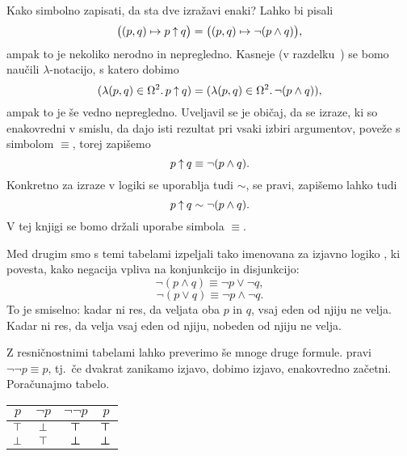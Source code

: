                 Kako simbolno zapisati, da sta dve izražavi enaki? Lahko bi pisali
                \[\big((p, q) \mapsto p \mathbin{\uparrow} q\big) = \big((p, q) \mapsto \lnot(p \land q)\big),\]
                ampak to je nekoliko nerodno in nepregledno. Kasneje (v razdelku~) se bomo naučili $\lambda$-notacijo, s katero dobimo
                \[(\lambda (p, q) \in \Omega^2 .\, p \mathbin{\uparrow} q) = (\lambda (p, q) \in \Omega^2 .\, \lnot(p \land q)),\]
                ampak to je še vedno nepregledno. Uveljavil se je običaj, da se izraze, ki so enakovredni v smislu, da dajo isti rezultat pri vsaki izbiri argumentov, poveže s simbolom $\equiv$, torej zapišemo
                \[p \mathbin{\uparrow} q \equiv \lnot(p \land q).\]
                Konkretno za izraze v logiki se uporablja tudi $\sim$, se pravi, zapišemo lahko tudi
                \[p \mathbin{\uparrow} q \sim \lnot(p \land q).\]
                V tej knjigi se bomo držali uporabe simbola $\equiv$. 

                Med drugim smo s temi tabelami izpeljali tako imenovana  za izjavno logiko , ki povesta, kako negacija vpliva na konjunkcijo in disjunkcijo:
                \[\lnot(p \land q) \equiv \lnot{p} \lor \lnot{q},\]
                \[\lnot(p \lor q) \equiv \lnot{p} \land \lnot{q}.\]
                To je smiselno: kadar ni res, da veljata oba $p$ in $q$, vsaj eden od njiju ne velja. Kadar ni res, da velja vsaj eden od njiju, nobeden od njiju ne velja.

                Z resničnostnimi tabelami lahko preverimo še mnoge druge formule.  pravi $\lnot\lnot{p} \equiv p$, tj.~če dvakrat zanikamo izjavo, dobimo izjavo, enakovredno začetni. Poračunajmo tabelo.

                \begin{center}
                        \begin{tabular}{c|ccc}
                                $p$ & $\lnot{p}$ & $\lnot\lnot{p}$ & $p$ \\
                                \hline
                                $\top$ & $\bot$ & $\boldsymbol{\top}$ & $\boldsymbol{\top}$ \\
                                $\bot$ & $\top$ & $\boldsymbol{\bot}$ & $\boldsymbol{\bot}$
                        \end{tabular}
                \end{center}

